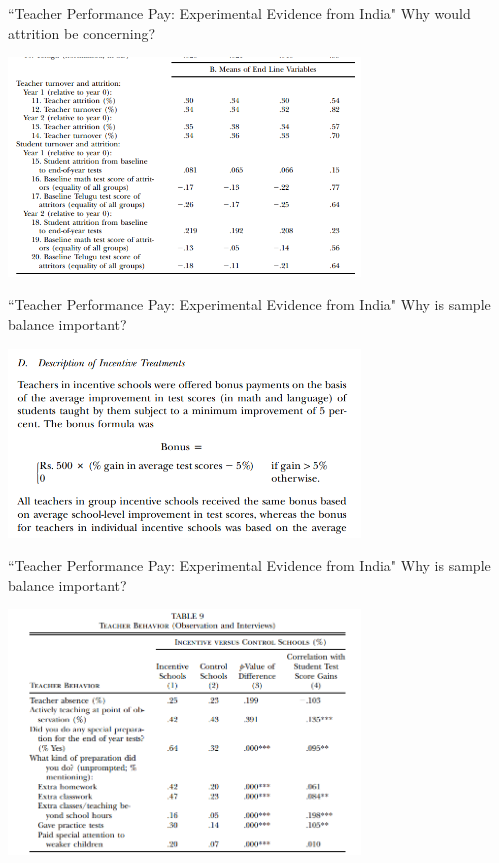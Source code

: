 \documentclass[aspectratio=169,usenames,dvipsnames]{beamer}
\begin{document}
\begin{frame}{``Teacher Performance Pay: Experimental Evidence from India"}
Why would attrition be concerning?

    \includegraphics[width=0.7\textwidth]{pictures/balance_teachers_end.png}
\end{frame}

\begin{frame}{``Teacher Performance Pay: Experimental Evidence from India"}
Why is sample balance important?

    \includegraphics[width=0.7\textwidth]{pictures/bonus_scheme_teachers.png}
\end{frame}

\begin{frame}{``Teacher Performance Pay: Experimental Evidence from India"}
Why is sample balance important?

    \includegraphics[width=0.7\textwidth]{pictures/teacher_behavior.png}
\end{frame}
\end{document}
